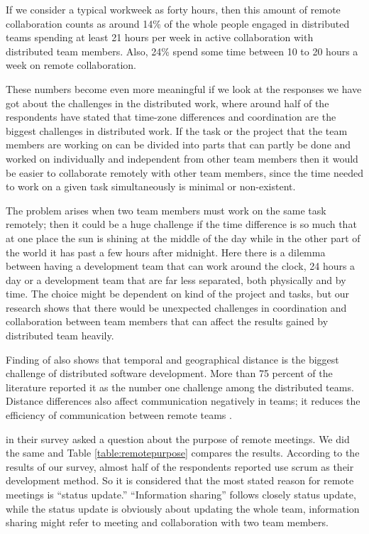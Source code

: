 If we consider a typical workweek as forty hours, then this amount of remote collaboration counts as around 14\% of the whole people engaged in distributed teams spending at least 21 hours per week in active collaboration with distributed team members. Also, 24\% spend some time between 10 to 20 hours a week on remote collaboration. 

These numbers become even more meaningful if we look at the responses we have got about the challenges in the distributed work, where around half of the respondents have stated that time-zone differences and coordination are the biggest challenges in distributed work. 
If the task or the project that the team members are working on can be divided into parts that can partly be done and worked on individually and independent from other team members then it would be easier to collaborate remotely with other team members, since the time needed to work on a given task simultaneously is minimal or non-existent. 

The problem arises when two team members must work on the same task remotely; then it could be a huge challenge if the time difference is so much that at one place the sun is shining at the middle of the day while in the other part of the world it has past a few hours after midnight. 
Here there is a dilemma between having a development team that can work around the clock, 24 hours a day or a development team that are far less separated, both physically and by time. The choice might be dependent on kind of the project and tasks, but our research shows that there would be unexpected challenges in coordination and collaboration between team members that can affect the results gained by distributed team heavily. 

Finding of \citet{Ibrahim2015} also shows that temporal and geographical distance is the biggest challenge of distributed software development. More than 75 percent of the literature reported it as the number one challenge among the distributed teams. Distance differences also affect communication negatively in teams; it reduces the efficiency of communication between remote teams \citep{Dorairaj2011}.

\citet{Marlow2016} in their survey asked a question about the purpose of remote meetings. We did the same and Table \ref{table:remotepurpose} compares the results. According to the results of our survey, almost half of the respondents reported use scrum as their development method. So it is considered that the most stated reason for remote meetings is “status update.” “Information sharing” follows closely status update, while the status update is obviously about updating the whole team, information sharing might refer to meeting and collaboration with two team members.

